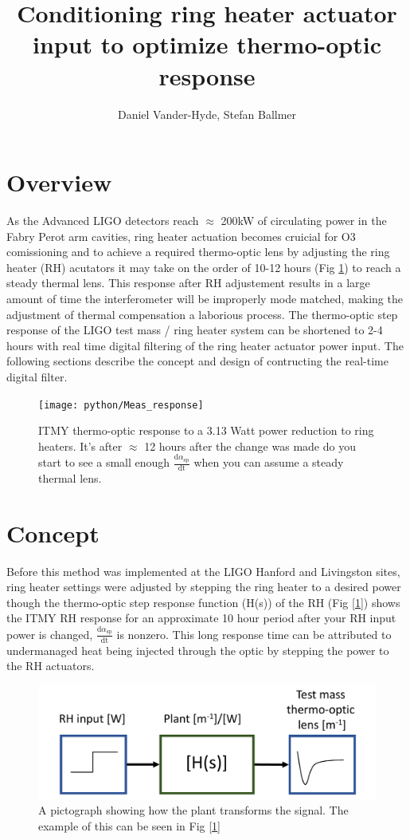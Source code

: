 \documentclass[colorlinks=true,pdfstartview=FitV,linkcolor=blue,
            citecolor=magenta,urlcolor=red]{ligodoc}
\title{Conditioning ring heater actuator input to optimize thermo-optic response}
\author{Daniel Vander-Hyde, Stefan Ballmer}
\begin{document}
\section{Overview}
\label{sec:I}
As the Advanced LIGO detectors reach $\approx$ 200kW of circulating power in the Fabry Perot arm cavities, ring heater actuation becomes cruicial for O3 comissioning and to achieve a required thermo-optic lens by adjusting the ring heater (RH) acutators it may take on the order of 10-12 hours (Fig \ref{fig:meas}) to reach a steady thermal lens. This response after RH adjustement results in a large amount of time the interferometer will be improperly mode matched, making the adjustment of thermal compensation a laborious process. The thermo-optic step response of the LIGO test mass / ring heater system can be shortened to 2-4 hours with real time digital filtering of the ring heater actuator power input. The following sections describe the concept and design of contructing the real-time digital filter.


\begin{figure}[H]
 \texttt{[image: python/Meas\_response]}
 \caption{ITMY thermo-optic response to a 3.13 Watt power reduction to ring heaters. It's after $\approx$ 12 hours after the change was made do you start to see a small enough $\frac{\mathrm{d} \alpha_\mathrm{sp}}{\mathrm{dt}}$ when you can assume a steady thermal lens.}
 \label{fig:meas}
\end{figure}
\section{Concept}
\label{sec:III}

Before this method was implemented at the LIGO Hanford and Livingston sites, ring heater settings were adjusted by stepping the ring heater to a desired power though the thermo-optic step response function (H(s)) of the RH (Fig [\ref{fig:meas}]) shows the ITMY RH response for an approximate 10 hour period after your RH input power is changed,  $\frac{\mathrm{d}\alpha_{\mathrm{sp}}}{\mathrm{dt}}$ is nonzero. This long response time can be attributed to undermanaged heat being injected through the optic by stepping the power to the RH actuators.

\begin{figure}[H]
\includegraphics[page=1,width=\textwidth]{RH_input_filter_figures.pdf}
\caption{A pictograph showing how the plant transforms the signal. The example of this can be seen in Fig [\ref{fig:meas}]}
\label{fig:justplant}
\end{figure}
\end{document}
